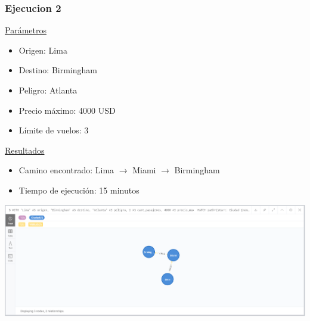\documentclass[a4paper,11pt]{article}
\begin{document}
\subsubsection*{Ejecucion 2}
\noindent
\underline{Parámetros}
\begin{itemize}
\item Origen: Lima
\item Destino: Birmingham
\item Peligro: Atlanta
\item Precio máximo: 4000 USD
\item Límite de vuelos: 3
\end{itemize}
\underline{Resultados}
\begin{itemize}
\item Camino encontrado: Lima $\rightarrow$ Miami $\rightarrow$ Birmingham
\item Tiempo de ejecución: 15 minutos
\end{itemize}
\begin{center}
\includegraphics[scale=0.40]{./imagenes/consultaB-ejec2.png}
\end{center}
\end{document}
